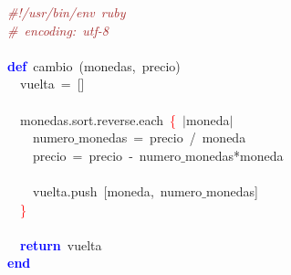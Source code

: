 \noindent
\mbox{}\textit{\textcolor{Brown}{\#!/usr/bin/env\ ruby}} \\
\mbox{}\textit{\textcolor{Brown}{\#\ encoding:\ utf-8}} \\
\mbox{} \\
\mbox{}\textbf{\textcolor{Blue}{def}}\ cambio\ \textcolor{BrickRed}{(}monedas\textcolor{BrickRed}{,}\ precio\textcolor{BrickRed}{)} \\
\mbox{}\ \ vuelta\ \textcolor{BrickRed}{=}\ \textcolor{BrickRed}{[]} \\
\mbox{} \\
\mbox{}\ \ monedas\textcolor{BrickRed}{.}sort\textcolor{BrickRed}{.}reverse\textcolor{BrickRed}{.}each\ \textcolor{Red}{\{}\ \textcolor{BrickRed}{$|$}moneda\textcolor{BrickRed}{$|$} \\
\mbox{}\ \ \ \ numero$\_$monedas\ \textcolor{BrickRed}{=}\ precio\ \textcolor{BrickRed}{/}\ moneda \\
\mbox{}\ \ \ \ precio\ \textcolor{BrickRed}{=}\ precio\ \textcolor{BrickRed}{-}\ numero$\_$monedas\textcolor{BrickRed}{*}moneda \\
\mbox{} \\
\mbox{}\ \ \ \ vuelta\textcolor{BrickRed}{.}push\ \textcolor{BrickRed}{[}moneda\textcolor{BrickRed}{,}\ numero$\_$monedas\textcolor{BrickRed}{]} \\
\mbox{}\ \ \textcolor{Red}{\}} \\
\mbox{} \\
\mbox{}\ \ \textbf{\textcolor{Blue}{return}}\ vuelta \\
\mbox{}\textbf{\textcolor{Blue}{end}} \\
\mbox{}
